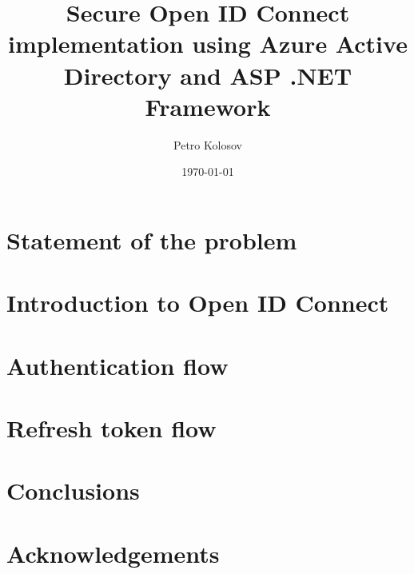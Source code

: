 \documentclass[12pt,letterpaper,oneside,reqno]{amsart}
\title[Secure OIDC implementation using Azure AD and ASP .NET Framework]
{Secure Open ID Connect implementation using Azure Active Directory and ASP .NET Framework}
\author[Petro Kolosov]{Petro Kolosov}
\date{\today}
\numberwithin{equation}{section}
\begin{document}
    \begin{abstract}
        
    \end{abstract}

    \maketitle

    \tableofcontents


    \section{Statement of the problem}\label{sec:statement-of-the-problem}
    


    \section{Introduction to Open ID Connect}\label{sec:introduction-to-open-id-connect}
    


    \section{Authentication flow}\label{sec:authentication-flow}
    


    \section{Refresh token flow}\label{sec:refresh-token-flow}
    


    \section{Conclusions}\label{sec:conclusions}
    


    \section{Acknowledgements}\label{sec:acknowledgements}
    

    
    
\end{document}
